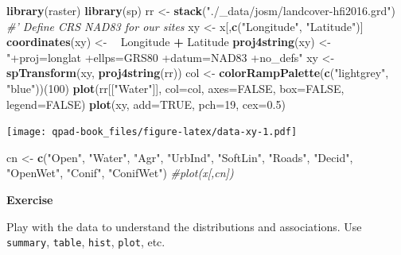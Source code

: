\documentclass[12pt,]{book}
\newenvironment{Shaded}{\begin{snugshade}}{\end{snugshade}}
\newcommand{\CommentTok}[1]{\textcolor[rgb]{0.56,0.35,0.01}{\textit{#1}}}
\newcommand{\DataTypeTok}[1]{\textcolor[rgb]{0.13,0.29,0.53}{#1}}
\newcommand{\DecValTok}[1]{\textcolor[rgb]{0.00,0.00,0.81}{#1}}
\newcommand{\ErrorTok}[1]{\textcolor[rgb]{0.64,0.00,0.00}{\textbf{#1}}}
\newcommand{\FloatTok}[1]{\textcolor[rgb]{0.00,0.00,0.81}{#1}}
\newcommand{\KeywordTok}[1]{\textcolor[rgb]{0.13,0.29,0.53}{\textbf{#1}}}
\newcommand{\NormalTok}[1]{#1}
\newcommand{\OperatorTok}[1]{\textcolor[rgb]{0.81,0.36,0.00}{\textbf{#1}}}
\newcommand{\OtherTok}[1]{\textcolor[rgb]{0.56,0.35,0.01}{#1}}
\newcommand{\StringTok}[1]{\textcolor[rgb]{0.31,0.60,0.02}{#1}}
\let\BeginKnitrBlock\begin \let\EndKnitrBlock\end
\begin{document}
\begin{Shaded}
\begin{Highlighting}[]
\KeywordTok{library}\NormalTok{(raster)}
\KeywordTok{library}\NormalTok{(sp)}
\NormalTok{rr <-}\StringTok{ }\KeywordTok{stack}\NormalTok{(}\StringTok{"./_data/josm/landcover-hfi2016.grd"}\NormalTok{)}
\CommentTok{#' Define CRS NAD83 for our sites}
\NormalTok{xy <-}\StringTok{ }\NormalTok{x[,}\KeywordTok{c}\NormalTok{(}\StringTok{"Longitude"}\NormalTok{, }\StringTok{"Latitude"}\NormalTok{)]}
\KeywordTok{coordinates}\NormalTok{(xy) <-}\StringTok{ }\ErrorTok{~}\StringTok{ }\NormalTok{Longitude }\OperatorTok{+}\StringTok{ }\NormalTok{Latitude}
\KeywordTok{proj4string}\NormalTok{(xy) <-}\StringTok{ "+proj=longlat +ellps=GRS80 +datum=NAD83 +no_defs"}
\NormalTok{xy <-}\StringTok{ }\KeywordTok{spTransform}\NormalTok{(xy, }\KeywordTok{proj4string}\NormalTok{(rr))}
\NormalTok{col <-}\StringTok{ }\KeywordTok{colorRampPalette}\NormalTok{(}\KeywordTok{c}\NormalTok{(}\StringTok{"lightgrey"}\NormalTok{, }\StringTok{"blue"}\NormalTok{))(}\DecValTok{100}\NormalTok{)}
\KeywordTok{plot}\NormalTok{(rr[[}\StringTok{"Water"}\NormalTok{]], }\DataTypeTok{col=}\NormalTok{col, }\DataTypeTok{axes=}\OtherTok{FALSE}\NormalTok{, }\DataTypeTok{box=}\OtherTok{FALSE}\NormalTok{, }\DataTypeTok{legend=}\OtherTok{FALSE}\NormalTok{)}
\KeywordTok{plot}\NormalTok{(xy, }\DataTypeTok{add=}\OtherTok{TRUE}\NormalTok{, }\DataTypeTok{pch=}\DecValTok{19}\NormalTok{, }\DataTypeTok{cex=}\FloatTok{0.5}\NormalTok{)}
\end{Highlighting}
\end{Shaded}

\texttt{[image: qpad-book\_files/figure-latex/data-xy-1.pdf]}

\begin{Shaded}
\begin{Highlighting}[]
\NormalTok{cn <-}\StringTok{ }\KeywordTok{c}\NormalTok{(}\StringTok{"Open"}\NormalTok{, }\StringTok{"Water"}\NormalTok{, }\StringTok{"Agr"}\NormalTok{, }\StringTok{"UrbInd"}\NormalTok{, }\StringTok{"SoftLin"}\NormalTok{, }\StringTok{"Roads"}\NormalTok{, }
  \StringTok{"Decid"}\NormalTok{, }\StringTok{"OpenWet"}\NormalTok{, }\StringTok{"Conif"}\NormalTok{, }\StringTok{"ConifWet"}\NormalTok{)}
\CommentTok{#plot(x[,cn])}
\end{Highlighting}
\end{Shaded}

\BeginKnitrBlock{rmdexercise}
\textbf{Exercise}

Play with the data to understand the distributions and associations.
Use \texttt{summary}, \texttt{table}, \texttt{hist}, \texttt{plot}, etc.
\EndKnitrBlock{rmdexercise}
\end{document}
